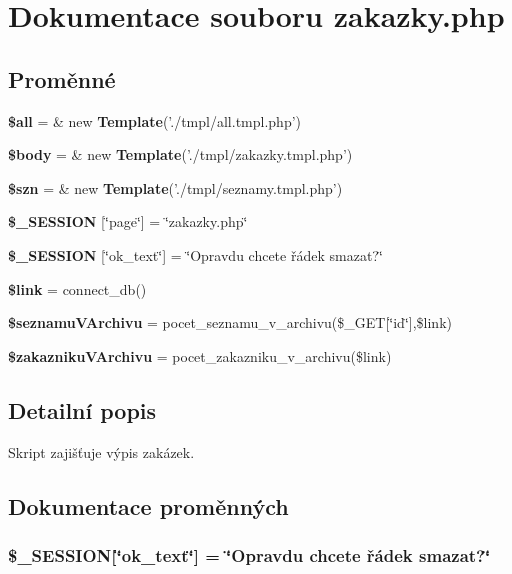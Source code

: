 \section{Dokumentace souboru zakazky.php}
\label{zakazky_8php}
\subsection*{Proměnné}
\begin{CompactItemize}
\item 
{\bf \$all} = \& new {\bf Template}('./tmpl/all.tmpl.php')
\item 
{\bf \$body} = \& new {\bf Template}('./tmpl/zakazky.tmpl.php')
\item 
{\bf \$szn} = \& new {\bf Template}('./tmpl/seznamy.tmpl.php')
\item 
{\bf \$\_\-SESSION} [\char`\"{}page\char`\"{}] = \char`\"{}zakazky.php\char`\"{}
\item 
{\bf \$\_\-SESSION} [\char`\"{}ok\_\-text\char`\"{}] = \char`\"{}Opravdu chcete řádek smazat?\char`\"{}
\item 
{\bf \$link} = connect\_\-db()
\item 
{\bf \$seznamuVArchivu} = pocet\_\-seznamu\_\-v\_\-archivu(\$\_\-GET[\char`\"{}id\char`\"{}],\$link)
\item 
{\bf \$zakaznikuVArchivu} = pocet\_\-zakazniku\_\-v\_\-archivu(\$link)
\end{CompactItemize}


\subsection{Detailní popis}
Skript zajišťuje výpis zakázek. 

\subsection{Dokumentace proměnných}
\subsubsection{\setlength{\rightskip}{0pt plus 5cm}\$\_\-SESSION[\char`\"{}ok\_\-text\char`\"{}] = \char`\"{}Opravdu chcete řádek smazat?\char`\"{}}\label{zakazky_8php_1169dce3a3019f09a3d51a5747879534}


